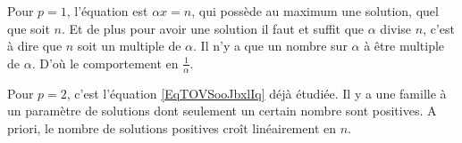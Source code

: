 \begin{example}
    Pour \( p=1\), l'équation est \( \alpha x=n\), qui possède au maximum une solution, quel que soit \( n\). Et de plus pour avoir une solution il faut et suffit que \( \alpha\) divise \( n\), c'est à dire que \( n\) soit un multiple de \( \alpha\). Il n'y a que un nombre sur \( \alpha\) à être multiple de \( \alpha\). D'où le comportement en \( \frac{1}{ \alpha }\).

    Pour \( p=2\), c'est l'équation \eqref{EqTOVSooJbxlIq} déjà étudiée. Il y a une famille à un paramètre de solutions dont seulement un certain nombre sont positives. A priori, le nombre de solutions positives croît linéairement en \( n\).
\end{example}
